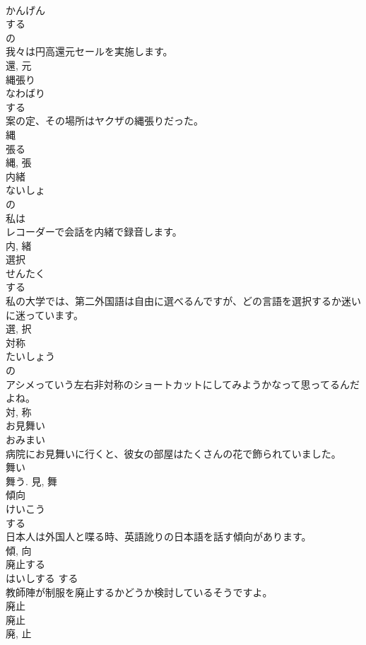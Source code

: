 \documentclass[8pt]{extreport}
\begin{document}
\begin{CJK}{UTF8}{min}
\\	かんげん	
\\	する 
\\	の 
\\	我々は円高還元セールを実施します。	
\\	還, 元	
\\	縄張り	
\\	なわばり	
\\	する 
\\	案の定、その場所はヤクザの縄張りだった。	
\\	縄 
\\	張る 
\\	縄, 張	
\\	内緒	
\\	ないしょ	
\\	の 
\\	私は
\\	レコーダーで会話を内緒で録音します。	
\\	内, 緒	
\\	選択	
\\	せんたく	
\\	する 
\\	私の大学では、第二外国語は自由に選べるんですが、どの言語を選択するか迷いに迷っています。	
\\	選, 択	
\\	対称	
\\	たいしょう	
\\	の 
\\	アシメっていう左右非対称のショートカットにしてみようかなって思ってるんだよね。	
\\	対, 称	
\\	お見舞い	
\\	おみまい	
\\	病院にお見舞いに行くと、彼女の部屋はたくさんの花で飾られていました。	
\\	舞い 
\\	舞う.	見, 舞	
\\	傾向	
\\	けいこう	
\\	する 
\\	日本人は外国人と喋る時、英語訛りの日本語を話す傾向があります。	
\\	傾, 向	
\\	廃止する	
\\	はいしする	する 
\\	教師陣が制服を廃止するかどうか検討しているそうですよ。	
\\	廃止 
\\	廃止 
\\	廃, 止	

\end{CJK}
\end{document}
